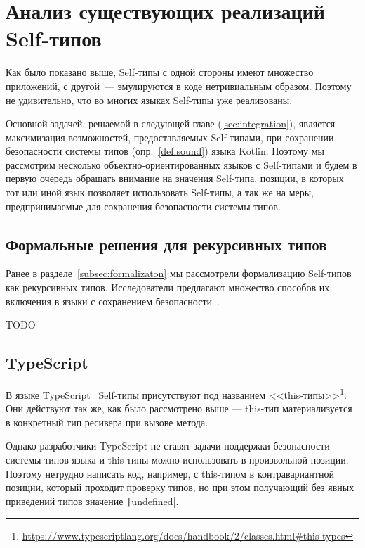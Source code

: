 \section{Анализ существующих реализаций Self-типов}

Как было показано выше, Self-типы с одной стороны имеют множество приложений, с другой~--- эмулируются в коде нетривиальным образом.
Поэтому не удивительно, что во многих языках Self-типы уже реализованы.

Основной задачей, решаемой в следующей главе (\ref{sec:integration}), является максимизация возможностей, предоставляемых Self-типами, при сохранении безопасности системы типов (опр.~\ref{def:sound}) языка Kotlin.
Поэтому мы рассмотрим несколько объектно-ориентированных языков с Self-типами и будем в первую очередь обращать внимание на значения Self-типа, позиции, в которых тот или иной язык позволяет использовать Self-типы, а так же на меры, предпринимаемые для сохранения безопасности системы типов.


\subsection{Формальные решения для рекурсивных типов} \label{subsec:formal-solutions}

Ранее в разделе~\ref{subsec:formalizaton} мы рассмотрели формализацию Self-типов как рекурсивных типов.
Исследователи предлагают множество способов их включения в языки с сохранением безопасности~\cite{bruce1997increasing, burstein1998rupiah, cook1989inheritance, ryu2016thistype, saito2009matching}.



TODO %


\subsection{TypeScript}

В языке TypeScript~\cite{bierman2014understanding} Self-типы присутствуют под названием <<this-типы>>\footnote{\url{https://www.typescriptlang.org/docs/handbook/2/classes.html\#this-types}}.
Они действуют так же, как было рассмотрено выше --- this-тип материализуется в конкретный тип ресивера при вызове метода.

Однако разработчики TypeScript не ставят задачи поддержки безопасности системы типов языка и this-типы можно использовать в произвольной позиции.
Поэтому нетрудно написать код, например, с this-типом в контравариантной позиции, который проходит проверку типов, но при этом получающий без явных приведений типов значение \texttt|undefined|.

